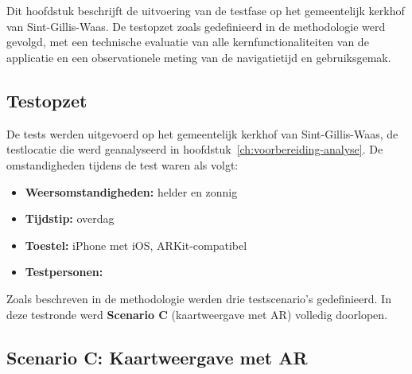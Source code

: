 
\chapter{}%
\label{ch:testen}

Dit hoofdstuk beschrijft de uitvoering van de testfase op het gemeentelijk
kerkhof van Sint-Gillis-Waas. De testopzet zoals gedefinieerd in de methodologie
werd gevolgd, met een technische evaluatie van alle kernfunctionaliteiten van de
applicatie en een observationele meting van de navigatietijd en gebruiksgemak.

\section{Testopzet}

De tests werden uitgevoerd op het gemeentelijk kerkhof van Sint-Gillis-Waas,
de testlocatie die werd geanalyseerd in hoofdstuk~\ref{ch:voorbereiding-analyse}.
De omstandigheden tijdens de test waren als volgt:

\begin{itemize}
    \item \textbf{Weersomstandigheden:} helder en zonnig
    \item \textbf{Tijdstip:} overdag
    \item \textbf{Toestel:} iPhone met iOS, ARKit-compatibel
    \item \textbf{Testpersonen:} %
\end{itemize}

Zoals beschreven in de methodologie werden drie testscenario's gedefinieerd.
In deze testronde werd \textbf{Scenario C} (kaartweergave met AR) volledig
doorlopen. %

\section{Scenario C: Kaartweergave met AR}

